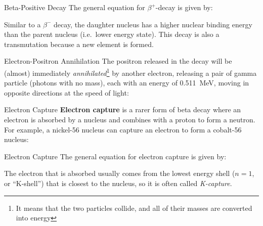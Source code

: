 \documentclass[12pt,compress,aspectratio=169]{beamer}
\begin{document}
\begin{frame}{Beta-Positive Decay}
  The general equation for $\beta^+$-decay is given by:
  

  Similar to a $\beta^-$ decay, the daughter nucleus has a higher nuclear
  binding energy than the parent nucleus (i.e.\ lower energy state). This decay
  is also a transmutation because a new element is formed.
\end{frame}



\begin{frame}{Electron-Positron Annihilation}
  The positron released in the decay will be (almost) immediately
  \emph{annihilated}\footnote{It means that the two particles collide, and all
    of their masses are converted into energy} by another electron, releasing a
  pair of gamma particle (photons with no mass), each with an energy of
  \SI{.511}{\mega\electronvolt}, moving in opposite directions at the speed of
  light:

\end{frame}



\begin{frame}{Electron Capture}
  \textbf{Electron capture} is a rarer form of beta decay where an electron is
  absorbed by a nucleus and combines with a proton to form a neutron. For
  example, a nickel-56 nucleus can capture an electron to form a cobalt-56
  nucleus:
  \begin{center}
  \end{center}

\end{frame}



\begin{frame}{Electron Capture}
  The general equation for electron capture is given by:
  
  
  The electron that is absorbed usually comes from the lowest energy shell
  ($n=1$, or ``K-shell'') that is closest to the nucleus, so it is often called
  \emph{K-capture}.
\end{frame}
\end{document}
